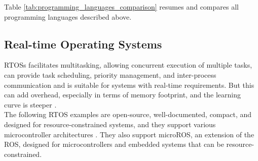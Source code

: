Table \ref{tab:programming_languages_comparison} resumes and compares all programming languages described above.
\begin{table}[H]
    \centering
    \caption{Comparison of Programming Languages in Embedded Systems}
    \label{tab:programming_languages_comparison}
\end{table}

\subsection{Real-time Operating Systems}
\glspl{RTOS} facilitates multitasking, allowing concurrent execution of multiple tasks, can provide task scheduling, priority management, and inter-process communication and is suitable for systems with real-time requirements.
But this can add overhead, especially in terms of memory footprint, and the learning curve is steeper \cite{RTOS1}.\\
The following \gls{RTOS} examples are open-source, well-documented, compact, and designed for resource-constrained systems, and they support various microcontroller architectures \cite{RTOS5}.
They also support microROS, an extension of the \gls{ROS}, designed for microcontrollers and embedded systems that can be resource-constrained.
